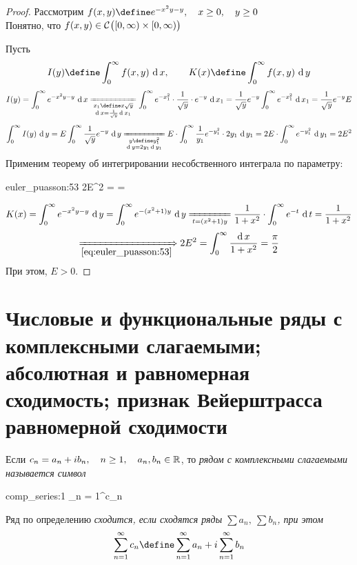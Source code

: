 \begin{proof}
	Рассмотрим $ f(x, y) \define e^{-x^2y - y}, \quad x \ge 0, \quad y \ge 0 $ \\
	Понятно, что $ f(x, y) \in \mathcal{C}^{} \big( {[0, \infty) \times [0, \infty)} \big)  $

	Пусть
	$$ I(y) \define \dint0\infty{f(x, y)}, \qquad K(x) \define \dint[y]0\infty{f(x, y)} $$
	$$ I(y) = \dint0\infty{e^{-x^2y - y}} \undereq{
		\begin{subarray}c
			x_1 \define x\sqrt y \\
			\di x = \frac1{\sqrt y}\di x_1
		\end{subarray}} \dint[x_1]0\infty{e^{-x_1^2} \cdot \frac1{\sqrt y} \cdot e^{-y}} = \frac1{\sqrt y} e^{-y} \dint[x_1]0\infty{e^{-x_1^2}} = \frac1{\sqrt y}e^{-y}E $$
	$$ \dint[y]0\infty{I(y)} = E \dint[y]0\infty{\frac1{\sqrt y}e^{-y}} \undereq{
		\begin{subarray}c
			y \define y_1^2 \\
			\di y = 2y_1\di y_1
		\end{subarray}} E \cdot \dint[y_1]0\infty{\frac1{y_1}e^{-y_1^2} \cdot 2y_1} = 2E \cdot \dint[y_1]0\infty{e^{-y_1^2}} = 2E^2 $$
	Применим теорему об интегрировании несобственного интеграла по параметру:
	\begin{equ}{euler_puasson:53}
		\implies 2E^2 =  = 
	\end{equ}
	$$ K(x) = \dint[y]0\infty{e^{-x^2y - y}} = \dint[y]0\infty{e^{-(x^2 + 1)y}} \undereq{t = (x^2 + 1)y} \frac1{1 + x^2} \cdot \dint[t]0\infty{e^{-t}} = \frac1{1 + x^2} $$
	$$ \underimp{\eref{euler_puasson:53}} 2E^2 = \dfint0\infty{1 + x^2} = \frac\pi2 $$
	При этом, $ E > 0 $.
\end{proof}

\section{Числовые и функциональные ряды с комплексными слагаемыми; абсолютная и равномерная сходимость; признак Вейерштрасса равномерной сходимости}

\begin{definition}
	Если $ c_n = a_n + ib_n, \quad n \ge 1, \quad a_n, b_n \in \mathbb{R} $, то \it{рядом с комплексными слагаемыми} называется символ
	\begin{equ}{comp_series:1}
		\sum_{n = 1}^\infty c_n
	\end{equ}
\end{definition}

\begin{definition}
	Ряд  по определению \it{сходится}, если сходятся ряды $ \sum a_n, ~ \sum b_n $, при этом
	$$ \sum_{n = 1}^\infty c_n \define \sum_{n = 1}^\infty a_n + i \sum_{n = 1}^\infty b_n $$
\end{definition}


